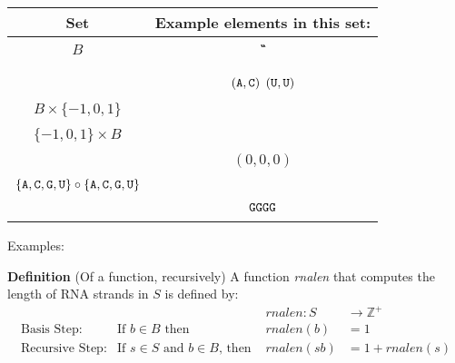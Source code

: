 \documentclass[12pt, oneside]{article}
\begin{document}
\begin{center}
\begin{tabular}{cc}
{\bf  Set} & {\bf Example elements in this set}:\\
\hline 
$B$ &\A \qquad \C \qquad \G \qquad \U \\
& \\
\hline
\phantom{$B \times B$} & $(\texttt{A}, \texttt{C})$ \qquad $(\texttt{U}, \texttt{U})$\\
& \\
\hline
$B \times \{-1,0,1\}$ & \\
& \\
\hline
$\{-1,0,1\} \times B$ & \\
& \\
\hline
\phantom{$\{-1,0,1\} \times \{-1,0,1\}  \times \{-1,0,1\} $} & \qquad $(0,0,0)$ \\
& \\
\hline
$ \{\texttt{A}, \texttt{C}, \texttt{G}, \texttt{U} \} \circ  \{\texttt{A}, \texttt{C}, \texttt{G}, \texttt{U} \}$& \\
& \\
\hline
\phantom{$\{G\} \circ \{G\} \circ \{G\}$} & \qquad $\texttt{G}\texttt{G}\texttt{G}\texttt{G}$ \\
& \\
\hline

\end{tabular}
\end{center}

\vfill
\vfill



Examples: 



\vfill 


{\bf Definition} (Of a function, recursively) A function \textit{rnalen} that computes the length of RNA strands in $S$ is defined by:
\[
\begin{array}{llll}
& & \textit{rnalen} : S & \to \mathbb{Z}^+ \\
\textrm{Basis Step:} & \textrm{If } b \in B\textrm{ then } & \textit{rnalen}(b) & = 1 \\
\textrm{Recursive Step:} & \textrm{If } s \in S\textrm{ and }b \in B\textrm{, then  } & \textit{rnalen}(sb) & = 1 + \textit{rnalen}(s)
\end{array}
\]
\end{document}
